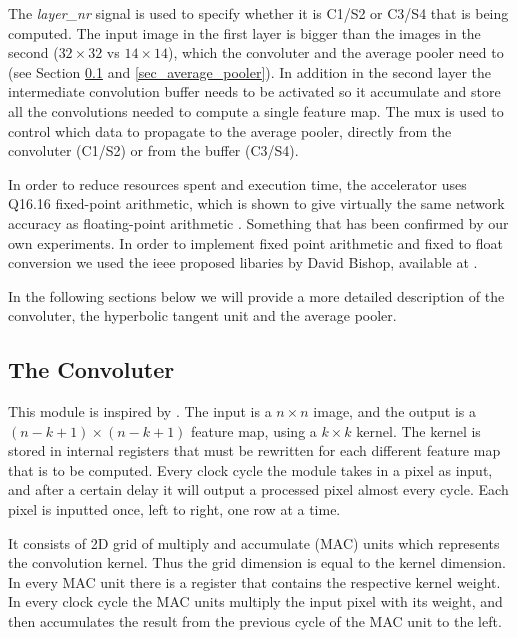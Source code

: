 The \textit{layer\_nr} signal is used to specify whether it is C1/S2 or C3/S4 that is being computed. The input image in the first layer is bigger than the images in the second ($ 32 \times 32 $ vs $ 14 \times 14 $), which the convoluter and the average pooler need to  (see Section \ref{sec_convoluter} and \ref{sec_average_pooler}). In addition in the second layer the intermediate convolution buffer needs to be activated so it accumulate and store all the convolutions needed to compute a single feature map. The mux is used to control which data to propagate to the average pooler, directly from the convoluter (C1/S2) or from the buffer (C3/S4). 

In order to reduce resources spent and execution time, the accelerator uses Q16.16 fixed-point arithmetic, which is shown to give virtually the same network accuracy as floating-point arithmetic\cite{Napocensis2009} \cite{Holt1993} \cite{Chen2014}. Something that has been confirmed by our own experiments. In order to implement fixed point arithmetic and fixed to float conversion we used the ieee proposed libaries by David Bishop, available at \cite{XXXXXXXXXXX}.   

In the following sections below we will provide a more detailed description of the convoluter, the hyperbolic tangent unit and the average pooler. 


\subsection{The Convoluter} \label{sec_convoluter}

This module is inspired by \cite{Farabet2009}. The input is a $ n \times n $ image, and the output is a $ (n-k+1) \times (n-k+1) $ feature map, using a $ k \times k $ kernel. The kernel is stored in internal registers that must be rewritten for each different feature map that is to be computed. Every clock cycle the module takes in a pixel as input, and after a certain delay it will output a processed pixel almost every cycle. Each pixel is inputted once, left to right, one row at a time. 

It consists of 2D grid of multiply and accumulate (MAC) units which represents the convolution kernel. Thus the grid dimension is equal to the kernel dimension. In every MAC unit there is a register that contains the respective kernel weight. In every clock cycle the MAC units multiply the input pixel with its weight, and then accumulates the result from the previous cycle of the MAC unit to the left. 

